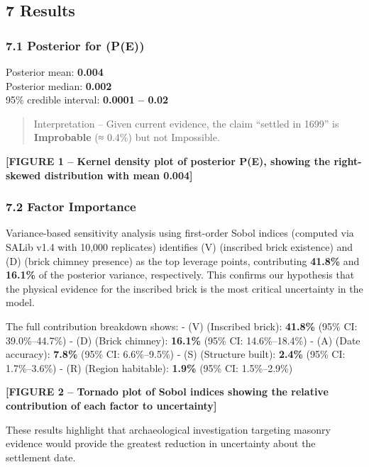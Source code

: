 \documentclass[
  11pt,
]{article}
\begin{document}
\subsection{7 Results}\label{results}

\subsubsection{7.1 Posterior for (P(E))}\label{posterior-for-pe}

Posterior mean: \textbf{0.004}\\
Posterior median: \textbf{0.002}\\
95\% credible interval: \textbf{0.0001 -- 0.02}

\begin{quote}
Interpretation -- Given current evidence, the claim ``settled in 1699''
is \textbf{Improbable} (≈ 0.4\%) but not Impossible.
\end{quote}

\textbf{{[}FIGURE 1 -- Kernel density plot of posterior P(E), showing
the right-skewed distribution with mean 0.004{]}}

\subsubsection{7.2 Factor Importance}\label{factor-importance}

Variance-based sensitivity analysis using first-order Sobol indices
(computed via SALib v1.4 with 10,000 replicates) identifies (V)
(inscribed brick existence) and (D) (brick chimney presence) as the top
leverage points, contributing \textbf{41.8\%} and \textbf{16.1\%} of the
posterior variance, respectively. This confirms our hypothesis that the
physical evidence for the inscribed brick is the most critical
uncertainty in the model.

The full contribution breakdown shows: - (V) (Inscribed brick):
\textbf{41.8\%} (95\% CI: 39.0\%--44.7\%) - (D) (Brick chimney):
\textbf{16.1\%} (95\% CI: 14.6\%--18.4\%) - (A) (Date accuracy):
\textbf{7.8\%} (95\% CI: 6.6\%--9.5\%) - (S) (Structure built):
\textbf{2.4\%} (95\% CI: 1.7\%--3.6\%) - (R) (Region habitable):
\textbf{1.9\%} (95\% CI: 1.5\%--2.9\%)

\textbf{{[}FIGURE 2 -- Tornado plot of Sobol indices showing the
relative contribution of each factor to uncertainty{]}}

These results highlight that archaeological investigation targeting
masonry evidence would provide the greatest reduction in uncertainty
about the settlement date.
\end{document}
